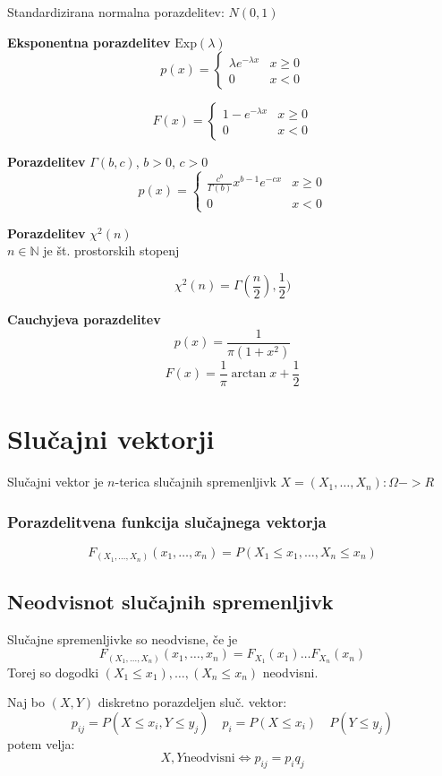 \begin{multicols}{4}
Standardizirana normalna porazdelitev: $N(0, 1)$

\textbf{Eksponentna porazdelitev} $\text{Exp}(\lambda)$
\[ p(x) = \begin{cases}
	\lambda e^{-\lambda x} & x \geq 0 \\
	0 & x < 0
\end{cases}\]

\[ F(x) = \begin{cases}
	1-e^{-\lambda x} & x \geq 0 \\
	0 & x < 0
\end{cases}\]


\textbf{Porazdelitev} $\Gamma(b,c)$, $b > 0$, $c > 0$
\[ p(x) = \begin{cases}
	\frac{c^b}{\Gamma(b)} x^{b-1} e^{-cx} & x \geq 0 \\
	0 & x < 0
\end{cases}\]

\textbf{Porazdelitev} $\chi^2(n)$ \\
$n \in \mathbb{N}$ je št. prostorskih stopenj

\[ \chi^2(n) = \Gamma(\frac{n}{2}), \frac{1}{2})\]

\textbf{Cauchyjeva porazdelitev}
\[ p(x) = \frac{1}{\pi (1+x^2)}\]
\[ F(x) = \frac{1}{\pi} \arctan x + \frac{1}{2}\]

\section{Slučajni vektorji}
Slučajni vektor je $n$-terica slučajnih spremenljivk $X = (X_1, \dots , X_n): \Omega -> R$ 

\subsubsection{Porazdelitvena funkcija slučajnega vektorja}
\[ F_{(X_1, \dots , X_n)}(x_1, \dots , x_n) = P(X_1 \leq x_1, \dots , X_n \leq x_n)\]

\subsection{Neodvisnot slučajnih spremenljivk}
Slučajne spremenljivke so neodvisne, če je
\[ F_{(X_1, \dots , X_n)}(x_1, \dots, x_n) = F_{X_1}(x_1) \dots F_{X_n}(x_n)\]
Torej so dogodki $(X_1 \leq x_1), \dots , (X_n \leq x_n)$ neodvisni.

Naj bo $(X, Y)$ diskretno porazdeljen sluč. vektor:
\[ p_{ij} = P(X \leq x_i, Y \leq y_j) \quad p_i = P(X \leq x_i) \quad P(Y \leq y_j) \]
potem velja:
\[ X, Y \text{neodvisni} \iff p_{ij} = p_i q_j \]



\end{multicols}
